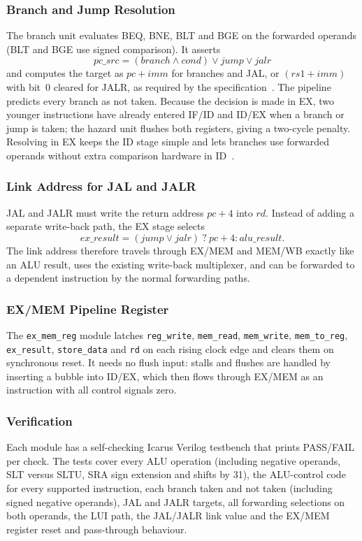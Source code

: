 \subsubsection{Branch and Jump Resolution}
The branch unit evaluates BEQ, BNE, BLT and BGE on the forwarded operands
(BLT and BGE use signed comparison). It asserts
\[
\mathit{pc\_src} = (\mathit{branch} \wedge \mathit{cond}) \vee \mathit{jump} \vee \mathit{jalr}
\]
and computes the target as $\mathit{pc} + \mathit{imm}$ for branches and JAL,
or $(\mathit{rs1} + \mathit{imm})$ with bit~0 cleared for JALR, as required
by the specification~\cite{kapish_riscv_isa}. The pipeline predicts every
branch as not taken. Because the decision is made in EX, two younger
instructions have already entered IF/ID and ID/EX when a branch or jump is
taken; the hazard unit flushes both registers, giving a two-cycle penalty.
Resolving in EX keeps the ID stage simple and lets branches use forwarded
operands without extra comparison hardware in ID~\cite{kapish_patterson_riscv}.

\subsubsection{Link Address for JAL and JALR}
JAL and JALR must write the return address $\mathit{pc}+4$ into $rd$. Instead
of adding a separate write-back path, the EX stage selects
\[
\mathit{ex\_result} = (\mathit{jump} \vee \mathit{jalr})\ ?\ \mathit{pc}+4 : \mathit{alu\_result}.
\]
The link address therefore travels through EX/MEM and MEM/WB exactly like an
ALU result, uses the existing write-back multiplexer, and can be forwarded to
a dependent instruction by the normal forwarding paths.

\subsubsection{EX/MEM Pipeline Register}
The \texttt{ex\_mem\_reg} module latches \texttt{reg\_write},
\texttt{mem\_read}, \texttt{mem\_write}, \texttt{mem\_to\_reg},
\texttt{ex\_result}, \texttt{store\_data} and \texttt{rd} on each rising clock
edge and clears them on synchronous reset. It needs no flush input: stalls and
flushes are handled by inserting a bubble into ID/EX, which then flows through
EX/MEM as an instruction with all control signals zero.

\subsubsection{Verification}
Each module has a self-checking Icarus Verilog testbench that prints PASS/FAIL
per check. The tests cover every ALU operation (including negative operands,
SLT versus SLTU, SRA sign extension and shifts by 31), the ALU-control code
for every supported instruction, each branch taken and not taken (including
signed negative operands), JAL and JALR targets, all forwarding selections on
both operands, the LUI path, the JAL/JALR link value and the EX/MEM register
reset and pass-through behaviour.
